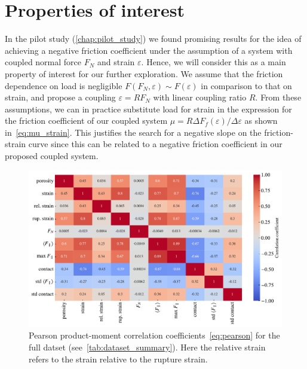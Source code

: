 

\section{Properties of interest} 
In the pilot study (\cref{chap:pilot_study}) we found promising results for the idea of achieving a negative friction coefficient under the assumption of a system with coupled normal force $F_N$ and strain $\varepsilon$. Hence, we will consider this as a main property of interest for our further exploration. We assume that the friction dependence on load is negligible $F(F_N, \varepsilon) \sim F(\varepsilon)$ in comparison to that on strain, and propose a coupling $\varepsilon = R F_N$ with linear coupling ratio $R$. From these assumptions, we can in practice substitute load for strain in the expression for the friction coefficient of our coupled system $\mu = R\Delta F_f(\varepsilon) / \Delta \varepsilon$ as shown in~\cref{eq:mu_strain}. This justifies the search for a negative slope on the friction-strain curve since this can be related to a negative friction coefficient in our proposed coupled system. 



\begin{figure}[H]
  \centering
  \includegraphics[width=0.81\linewidth]{figures/ML/corrcoef_matrix.pdf}
  \caption{Pearson product-moment correlation coefficients~\cref{eq:pearson} for the full datset (see~\cref{tab:dataset_summary}). Here the relative strain refers to the strain relative to the rupture strain. }
  \label{fig:corrcoef_matrix}
\end{figure}


